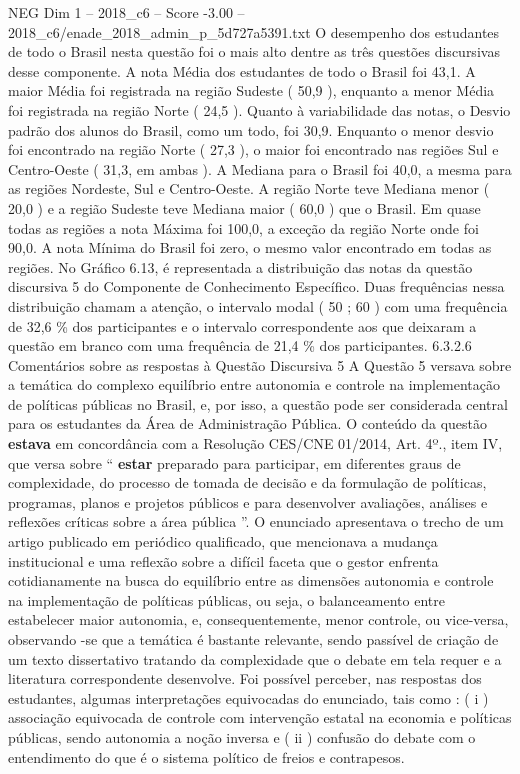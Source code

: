 \begin{textsample}{NEG Dim 1 – 2018\_c6 – Score -3.00 – 2018\_c6/enade\_2018\_admin\_p\_5d727a5391.txt}
O desempenho dos estudantes de todo o Brasil nesta questão foi o mais alto dentre as três questões discursivas desse componente.
A nota Média dos estudantes de todo o Brasil foi 43,1.
A maior Média foi registrada na região Sudeste ( 50,9 ), enquanto a menor Média foi registrada na região Norte ( 24,5 ).
Quanto à variabilidade das notas, o Desvio padrão dos alunos do Brasil, como um todo, foi 30,9.
Enquanto o menor desvio foi encontrado na região Norte ( 27,3 ), o maior foi encontrado nas regiões Sul e Centro-Oeste ( 31,3, em ambas ).
A Mediana para o Brasil foi 40,0, a mesma para as regiões Nordeste, Sul e Centro-Oeste.
A região Norte teve Mediana menor ( 20,0 ) e a região Sudeste teve Mediana maior ( 60,0 ) que o Brasil.
Em quase todas as regiões a nota Máxima foi 100,0, a exceção da região Norte onde foi 90,0.
A nota Mínima do Brasil foi zero, o mesmo valor encontrado em todas as regiões.
No Gráfico 6.13, é representada a distribuição das notas da questão discursiva 5 do Componente de Conhecimento Específico.
Duas frequências nessa distribuição chamam a atenção, o intervalo modal ( 50 ; 60 ) com uma frequência de 32,6 \% dos participantes e o intervalo correspondente aos que deixaram a questão em branco com uma frequência de 21,4 \% dos participantes. 6.3.2.6 Comentários sobre as respostas à Questão Discursiva 5 A Questão 5 versava sobre a temática do complexo equilíbrio entre autonomia e controle na implementação de políticas públicas no Brasil, e, por isso, a questão pode ser considerada central para os estudantes da Área de Administração Pública.
O conteúdo da questão \textbf{estava} em concordância com a Resolução CES/CNE 01/2014, Art. 4º., item IV, que versa sobre “ \textbf{estar} preparado para participar, em diferentes graus de complexidade, do processo de tomada de decisão e da formulação de políticas, programas, planos e projetos públicos e para desenvolver avaliações, análises e reflexões críticas sobre a área pública ”.
O enunciado apresentava o trecho de um artigo publicado em periódico qualificado, que mencionava a mudança institucional e uma reflexão sobre a difícil faceta que o gestor enfrenta cotidianamente na busca do equilíbrio entre as dimensões autonomia e controle na implementação de políticas públicas, ou seja, o balanceamento entre estabelecer maior autonomia, e, consequentemente, menor controle, ou vice-versa, observando -se que a temática é bastante relevante, sendo passível de criação de um texto dissertativo tratando da complexidade que o debate em tela requer e a literatura correspondente desenvolve.
Foi possível perceber, nas respostas dos estudantes, algumas interpretações equivocadas do enunciado, tais como : ( i ) associação equivocada de controle com intervenção estatal na economia e políticas públicas, sendo autonomia a noção inversa e ( ii ) confusão do debate com o entendimento do que é o sistema político de freios e contrapesos.

\end{textsample}

